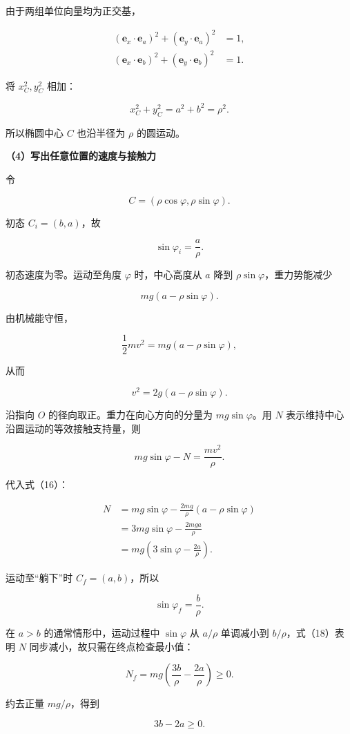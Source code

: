 \documentclass[12pt,a4paper,UTF8]{ctexart}
\begin{document}
由于两组单位向量均为正交基，

\[\begin{aligned}
(\bm e_x\cdot\bm e_a)^2+(\bm e_y\cdot\bm e_a)^2&=1,\\
(\bm e_x\cdot\bm e_b)^2+(\bm e_y\cdot\bm e_b)^2&=1.
\end{aligned}\]

将 \(x_C^2,y_C^2\) 相加：

\[x_C^2+y_C^2=a^2+b^2=\rho^2.\]

所以椭圆中心 \(C\) 也沿半径为 \(\rho\) 的圆运动。

\textbf{（4）写出任意位置的速度与接触力}

令

\[C=(\rho\cos\varphi,\rho\sin\varphi).\]

初态 \(C_i=(b,a)\)，故

\[\sin\varphi_i=\frac{a}{\rho}.\]

初态速度为零。运动至角度 \(\varphi\) 时，中心高度从 \(a\) 降到
\(\rho\sin\varphi\)，重力势能减少

\[mg(a-\rho\sin\varphi).\]

由机械能守恒，

\[\frac12mv^2=mg(a-\rho\sin\varphi),\]

从而

\[v^2=2g(a-\rho\sin\varphi).\]

沿指向 \(O\) 的径向取正。重力在向心方向的分量为 \(mg\sin\varphi\)。用
\(N\) 表示维持中心沿圆运动的等效接触支持量，则

\[mg\sin\varphi-N=\frac{mv^2}{\rho}.\]

代入式（16）：

\[\begin{aligned}
N
&=mg\sin\varphi-\frac{2mg}{\rho}(a-\rho\sin\varphi)\\
&=3mg\sin\varphi-\frac{2mga}{\rho}\\
&=mg\left(3\sin\varphi-\frac{2a}{\rho}\right).
\end{aligned}\]

运动至``躺下''时 \(C_f=(a,b)\)，所以

\[\sin\varphi_f=\frac{b}{\rho}.\]

在 \(a>b\) 的通常情形中，运动过程中 \(\sin\varphi\) 从 \(a/\rho\)
单调减小到 \(b/\rho\)，式（18）表明 \(N\)
同步减小，故只需在终点检查最小值：

\[N_f=mg\left(\frac{3b}{\rho}-\frac{2a}{\rho}\right)\geq0.\]

约去正量 \(mg/\rho\)，得到

\[3b-2a\geq0.\]
\end{document}
